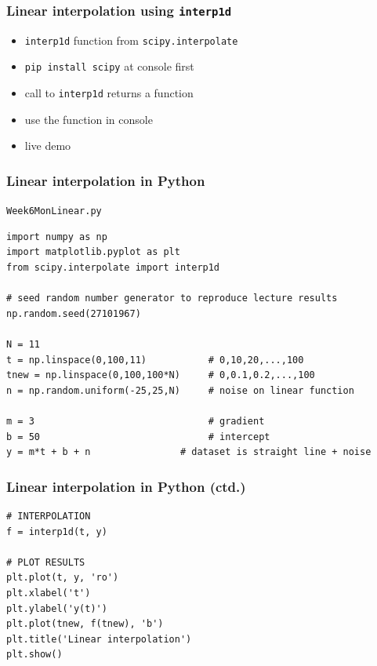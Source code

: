 \documentclass[english,14pt]{beamer}
\begin{document}

\begin{frame}[fragile]

\frametitle{Linear interpolation using \texttt{interp1d}}

\begin{itemize}
	\item \texttt{interp1d} function from \texttt{scipy.interpolate}
	\item \texttt{pip install scipy} at console first
	\item call to \texttt{interp1d} returns a function
	\item use the function in console
	\item live demo
\end{itemize}

\end{frame}


\begin{frame}[fragile]

\frametitle{Linear interpolation in Python}

\texttt{Week6MonLinear.py}

\begin{lstlisting}[style=CStyle,basicstyle=\scriptsize]
import numpy as np
import matplotlib.pyplot as plt
from scipy.interpolate import interp1d

# seed random number generator to reproduce lecture results
np.random.seed(27101967)

N = 11
t = np.linspace(0,100,11)           # 0,10,20,...,100
tnew = np.linspace(0,100,100*N)     # 0,0.1,0.2,...,100
n = np.random.uniform(-25,25,N)     # noise on linear function

m = 3                               # gradient
b = 50                              # intercept
y = m*t + b + n                # dataset is straight line + noise
\end{lstlisting}
\end{frame}


\begin{frame}[fragile]

\frametitle{Linear interpolation in Python (ctd.)}

\begin{lstlisting}[style=CStyle,basicstyle=\scriptsize]
# INTERPOLATION
f = interp1d(t, y)

# PLOT RESULTS
plt.plot(t, y, 'ro')
plt.xlabel('t')
plt.ylabel('y(t)')
plt.plot(tnew, f(tnew), 'b')
plt.title('Linear interpolation')
plt.show()
\end{lstlisting}
\end{frame}
\end{document}
